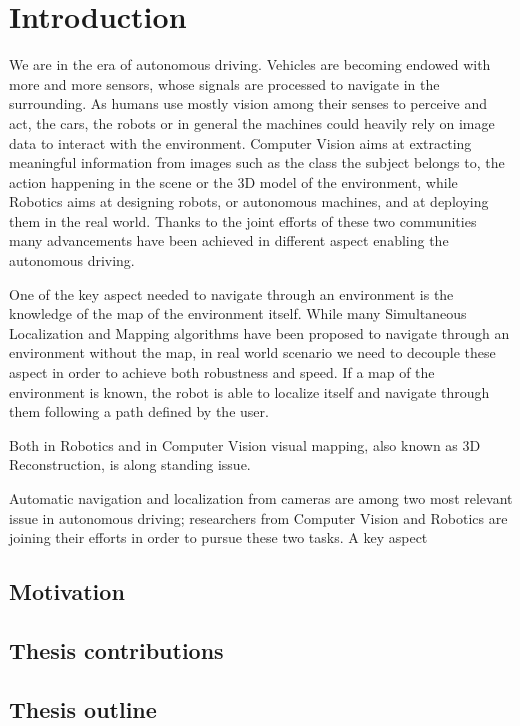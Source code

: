 
\chapter*{Introduction}
\label{sec:intro}
We are in the era of autonomous driving. Vehicles are becoming endowed with more and more sensors, whose signals are processed to navigate in the surrounding.
As humans use mostly vision among their senses to perceive and act, the cars, the robots or in general the machines could heavily rely on image data to interact with the environment.
Computer Vision aims at extracting meaningful information from images such as the class the subject belongs to, the action happening in the scene or the 3D model of the environment, while Robotics aims at designing robots, or autonomous machines, and at deploying them in the real world.
Thanks to the joint efforts of these two communities many advancements have been achieved in different aspect enabling the autonomous driving.

One of the key aspect needed to navigate through an environment is the knowledge of the map of the environment itself. 
While many Simultaneous Localization and Mapping algorithms have been proposed to navigate through an environment without the map, in real world scenario we need to decouple these aspect in order to achieve both robustness and speed.
If a map of the environment is known, the robot is able to localize itself and navigate through them following a path defined by the user.

Both in Robotics  and in Computer Vision visual mapping, also known as 3D Reconstruction, is along standing issue.



















Automatic navigation and localization from cameras are among two most relevant issue in autonomous driving; researchers from Computer Vision and Robotics are joining their efforts in order to pursue these two tasks. 
%
A key aspect  




\section{Motivation}

\section{Thesis contributions}
\section{Thesis outline}